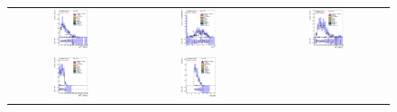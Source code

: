 \begin{figure}[h!]
\begin{center}
\begin{tabular}{ccc}
%
\includegraphics[width=0.30\textwidth]{appendices/figures/sdrs/LepPt_ELEMUONCR6_1W_NOMINAL.eps} &
\includegraphics[width=0.30\textwidth]{appendices/figures/sdrs/LepEta_ELEMUONCR6_1W_NOMINAL.eps} &
\includegraphics[width=0.30\textwidth]{appendices/figures/sdrs/MET_ELEMUONCR6_1W_NOMINAL.eps} \\
\includegraphics[width=0.30\textwidth]{appendices/figures/sdrs/Wlep_MassT_ELEMUONCR6_1W_NOMINAL.eps} &
\includegraphics[width=0.30\textwidth]{appendices/figures/sdrs/Njets25_ELEMUONCR6_1W_NOMINAL.eps}  &

\end{tabular}
\end{center}
\end{figure}
